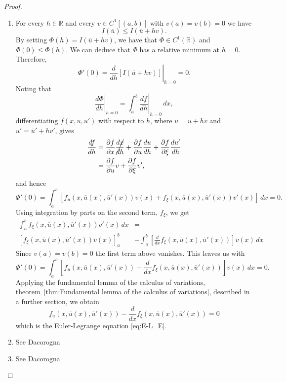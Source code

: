 \begin{proof}

\begin{enumerate}

    \item[(i)] For every $h \in \mathbb{R}$ and every $v \in C^1[(a,b)]$ with $v(a) = v(b) = 0$ we have
    \[
    I(\overline{u}) \le I(\overline{u} +hv).
    \]
    By setting $\Phi(h) = I(\overline{u} +hv)$, we have that $\Phi \in C^1(\mathbb{R})$ and $\Phi(0) \le \Phi(h)$. We can deduce that $\Phi$ has a relative minimum at $h=0$. Therefore, 
    \[
    \Phi '(0) = \left. \frac{d}{dh}[I(\overline{u} +hv)] \right |_{h=0}=0.
    \]
    Noting that
    \[
    \left. \frac{d\Phi}{dh}\right |_{h=0} = \left. \int_a^b \frac{df}{dh}\right |_{h=0} \, dx,
    \]
    differentiating $f(x,u,u')$ with respect to $h$, where $u=\overline{u} + hv$ and $u'=\overline{u}' + hv'$, gives
    \begin{align*}
        \frac{df}{dh} &= \frac{\partial f}{\partial x} \cancel{\frac{dx}{dh}} + \frac{\partial f}{\partial u}\frac{du}{dh} + \frac{\partial f}{\partial \xi}\frac{du'}{dh}\\
        &= \frac{\partial f}{\partial u}v + \frac{\partial f}{\partial \xi}v',
    \end{align*}
    and hence
    \[
       \Phi'(0) = \int_a^b [f_u(x,\overline{u}(x),\overline{u}'(x))v(x) + f_\xi(x,\overline{u}(x),\overline{u}'(x))v'(x)]\, dx = 0.
    \]
    Using integration by parts on the second term, $f_\xi$, we get
    \begin{align*}
        \int_a^b f_\xi(x,\overline{u}(x),\overline{u}'(x))v'(x)\, dx &= \\
         \left[f_\xi(x,\overline{u}(x),\overline{u}'(x))v(x)\right]_a^b &- \int_a^b \left[ \frac{d}{dx}f_\xi(x,\overline{u}(x),\overline{u}'(x)) \right] v(x) \, dx
    \end{align*}
    Since $v(a) = v(b) = 0$ the first term above vanishes. This leaves us with
    \[
    \Phi'(0) = \int_a^b \left[ f_u(x,\overline{u}(x),\overline{u}'(x)) - \frac{d}{dx}f_\xi(x,\overline{u}(x),\overline{u}'(x)) \right] v(x) \, dx = 0.
    \]
    Applying the fundamental lemma of the calculus of variations, theorem~\ref{thm:Fundamental lemma of the calculus of variations}, described in a further section, we obtain
    \[
        f_u(x,\overline{u}(x),\overline{u}'(x)) - \frac{d}{dx}f_\xi(x,\overline{u}(x),\overline{u}'(x)) = 0
    \]
    which is the Euler-Legrange equation \eqref{eq:E-L_E}.
    \item[(ii)]  See Dacorogna \cite[p.~61]{dacorogna}
    \item[(iii)] See Dacorogna \cite[p.~62]{dacorogna}
\end{enumerate}

\end{proof}

